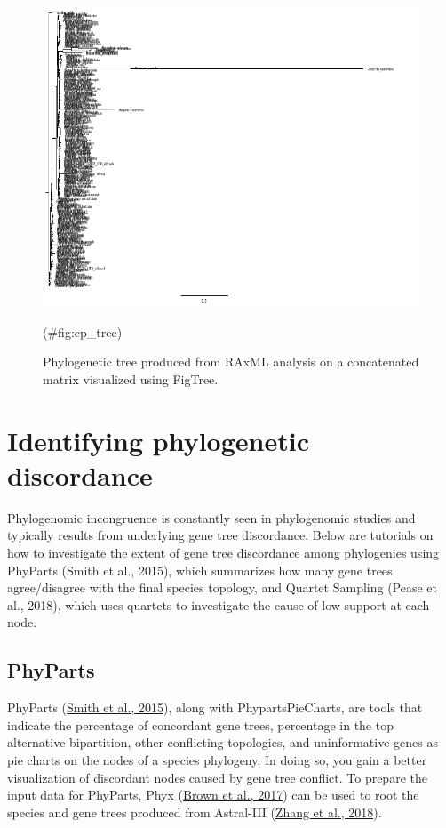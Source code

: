 \documentclass[
  12pt,
]{article}
\begin{document}
\begin{figure}
\includegraphics[width=1\linewidth]{Images/basalAst_cp_mapped_tree} \caption{Phylogenetic tree produced from RAxML analysis on a concatenated matrix visualized using FigTree.}(\#fig:cp_tree)
\end{figure}

\hypertarget{identifying-phylogenetic-discordance}{%
\section{Identifying phylogenetic discordance}\label{identifying-phylogenetic-discordance}}

Phylogenomic incongruence is constantly seen in phylogenomic studies and typically results from underlying gene tree discordance. Below are tutorials on how to investigate the extent of gene tree discordance among phylogenies using PhyParts (Smith et al., 2015), which summarizes how many gene trees agree/disagree with the final species topology, and Quartet Sampling (Pease et al., 2018), which uses quartets to investigate the cause of low support at each node.

\hypertarget{phyparts}{%
\subsection{PhyParts}\label{phyparts}}

PhyParts (\protect\hyperlink{ref-Smith2015}{Smith et al., 2015}), along with PhypartsPieCharts, are tools that indicate the percentage of concordant gene trees, percentage in the top alternative bipartition, other conflicting topologies, and uninformative genes as pie charts on the nodes of a species phylogeny. In doing so, you gain a better visualization of discordant nodes caused by gene tree conflict. To prepare the input data for PhyParts, Phyx (\protect\hyperlink{ref-Brown2017}{Brown et al., 2017}) can be used to root the species and gene trees produced from Astral-III (\protect\hyperlink{ref-Zhang2018}{Zhang et al., 2018}).
\end{document}
